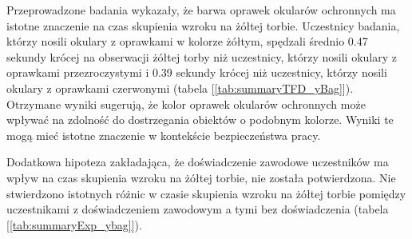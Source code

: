 Przeprowadzone badania wykazały, że barwa oprawek okularów ochronnych ma istotne znaczenie na czas skupienia wzroku na żółtej torbie. 
Uczestnicy badania, którzy nosili okulary z oprawkami w kolorze żółtym, 
spędzali średnio 0.47 sekundy krócej na obserwacji żółtej torby niż uczestnicy, którzy nosili okulary z oprawkami przezroczystymi i 
0.39 sekundy krócej niż uczestnicy, którzy nosili okulary z oprawkami czerwonymi (tabela [\ref{tab:summaryTFD_yBag}]). 
Otrzymane wyniki sugerują, że kolor oprawek okularów ochronnych może wpływać na zdolność do dostrzegania obiektów o podobnym kolorze.
Wyniki te mogą mieć istotne znaczenie w kontekście bezpieczeństwa pracy.

Dodatkowa hipoteza zakładająca, że doświadczenie zawodowe uczestników ma wpływ na czas skupienia wzroku na żółtej torbie,
nie została potwierdzona. 
Nie stwierdzono istotnych różnic w czasie skupienia wzroku na żółtej torbie pomiędzy uczestnikami z doświadczeniem zawodowym a tymi bez doświadczenia (tabela [\ref{tab:summaryExp_ybag}]).